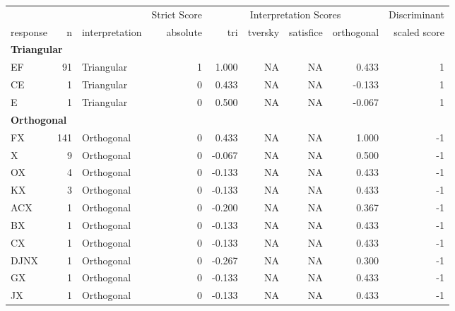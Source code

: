 \documentclass[
  letterpaper,
  DIV=11,
  numbers=noendperiod]{scrreprt}
\begin{document}
\begin{tabular}[t]{l|r|l|r|r|r|r|r|r}
\hline
\multicolumn{3}{c|}{ } & \multicolumn{1}{c|}{Strict Score} & \multicolumn{4}{c|}{Interpretation Scores} & \multicolumn{1}{c}{Discriminant} \\
\cline{4-4} \cline{5-8} \cline{9-9}
response & n & interpretation & absolute & tri & tversky & satisfice & orthogonal & scaled score\\
\hline
\multicolumn{9}{l}{\textbf{Triangular}}\\
\hline
\hspace{1em}EF & 91 & Triangular & 1 & 1.000 & NA & NA & 0.433 & 1\\
\hline
\hspace{1em}CE & 1 & Triangular & 0 & 0.433 & NA & NA & -0.133 & 1\\
\hline
\hspace{1em}E & 1 & Triangular & 0 & 0.500 & NA & NA & -0.067 & 1\\
\hline
\multicolumn{9}{l}{\textbf{Orthogonal}}\\
\hline
\hspace{1em}FX & 141 & Orthogonal & 0 & 0.433 & NA & NA & 1.000 & -1\\
\hline
\hspace{1em}X & 9 & Orthogonal & 0 & -0.067 & NA & NA & 0.500 & -1\\
\hline
\hspace{1em}OX & 4 & Orthogonal & 0 & -0.133 & NA & NA & 0.433 & -1\\
\hline
\hspace{1em}KX & 3 & Orthogonal & 0 & -0.133 & NA & NA & 0.433 & -1\\
\hline
\hspace{1em}ACX & 1 & Orthogonal & 0 & -0.200 & NA & NA & 0.367 & -1\\
\hline
\hspace{1em}BX & 1 & Orthogonal & 0 & -0.133 & NA & NA & 0.433 & -1\\
\hline
\hspace{1em}CX & 1 & Orthogonal & 0 & -0.133 & NA & NA & 0.433 & -1\\
\hline
\hspace{1em}DJNX & 1 & Orthogonal & 0 & -0.267 & NA & NA & 0.300 & -1\\
\hline
\hspace{1em}GX & 1 & Orthogonal & 0 & -0.133 & NA & NA & 0.433 & -1\\
\hline
\hspace{1em}JX & 1 & Orthogonal & 0 & -0.133 & NA & NA & 0.433 & -1\\

\end{tabular}
\end{document}
